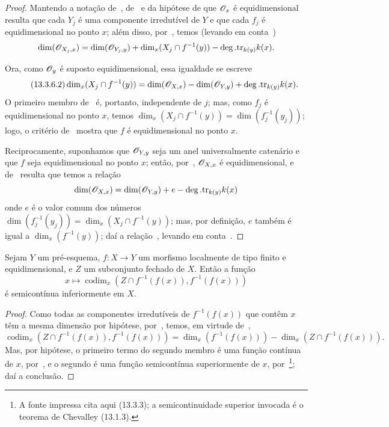 \begin{proof}
Mantendo a notação de~, de~ e da hipótese
de que $\mathscr{O}_x$ é equidimensional resulta que cada $Y_j$ é uma componente
irredutível de $Y$ e que cada $f_j$ é equidimensional no ponto $x$; além disso,
por~, temos (levando em conta~)
\[
  \dim(\mathscr{O}_{X_j,x})=\dim(\mathscr{O}_{Y_j,y})+\dim_x(X_j\cap f^{-1}(y))-\deg.\mathrm{tr}_{k(y)}k(x).
\]


Ora, como $\mathscr{O}_y$ é suposto equidimensional, essa igualdade se escreve
\[
\tag{13.3.6.2}
\label{IV.13.3.6.2}
  \dim_x(X_j\cap f^{-1}(y))=\dim(\sh{O}_{X,x})-\dim(\sh{O}_{Y,y})+\deg.\mathrm{tr}_{k(y)}k(x).
\]
O primeiro membro de~ é, portanto, independente de $j$;
mas, como $f_j$ é equidimensional no ponto $x$, temos
$\dim_x(X_j\cap f^{-1}(y))=\dim(f_j^{-1}(y_j))$; logo, o critério
de~ mostra que $f$ é equidimensional no ponto $x$.

Reciprocamente, suponhamos que $\mathscr{O}_{Y,y}$ seja um anel universalmente
catenário e que $f$ seja equidimensional no ponto $x$; então,
por~, $\mathscr{O}_{X,x}$ é equidimensional, e de~
resulta que temos a relação
\[
  \dim(\mathscr{O}_{X,x})=\dim(\mathscr{O}_{Y,y})+e-\deg.\mathrm{tr}_{k(y)}k(x)
\]
onde $e$ é o valor comum dos números
$\dim(f_j^{-1}(y_j))=\dim_x(X_j\cap f^{-1}(y))$; mas, por definição,
$e$ também é igual a $\dim_x(f^{-1}(y))$; daí a relação~,
levando em conta~.
\end{proof}

\begin{proposition}[13.3.7]
\label{IV.13.3.7}
Sejam $Y$ um pré-esquema, $f:X\to Y$ um morfismo localmente de tipo finito
e equidimensional, e $Z$ um subconjunto fechado de $X$.
Então a função
\[
\label{IV.13.3.7.1}
\tag{13.3.7.1}
  x\mapsto\operatorname{codim}_x(Z\cap f^{-1}(f(x)),f^{-1}(f(x)))
\]
é semicontínua inferiormente em $X$.
\end{proposition}

\begin{proof}
Como todas as componentes irredutíveis de $f^{-1}(f(x))$ que contêm $x$
têm a mesma dimensão por hipótese, por~, temos, em virtude
de~,
\[
  \operatorname{codim}_x(Z\cap f^{-1}(f(x)),f^{-1}(f(x)))=\dim_x(f^{-1}(f(x)))-\dim_x(Z\cap f^{-1}(f(x))).
\]
Mas, por hipótese, o primeiro termo do segundo membro é uma função contínua
de $x$, por~, e o segundo é uma função semicontínua
superiormente de $x$, por~\footnote{A fonte impressa cita
aqui (13.3.3); a semicontinuidade superior invocada é o teorema de
Chevalley (13.1.3).}; daí a conclusão.
\end{proof}

